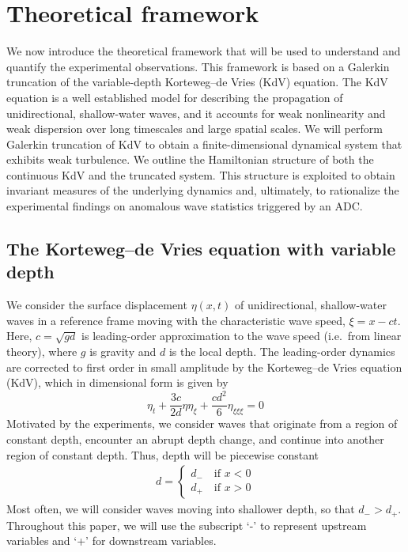 \documentclass[11pt]{article}
\newcommand{\depth}{d}
\newcommand{\dup}{\depth_{-}}
\newcommand{\ddn}{\depth_{+}}
\begin{document}
\section{Theoretical framework}
\label{theory}

We now introduce the theoretical framework that will be used to understand and quantify the experimental observations. This framework is based on a Galerkin truncation of the variable-depth Korteweg–de Vries (KdV) equation. The KdV equation is a well established model for describing the propagation of unidirectional, shallow-water waves, and it accounts for weak nonlinearity and weak dispersion over long timescales and large spatial scales. We will perform Galerkin truncation of KdV to obtain a finite-dimensional dynamical system that exhibits weak turbulence. We outline the Hamiltonian structure of both the continuous KdV and the truncated system. This structure is exploited to obtain invariant measures of the underlying dynamics and, ultimately, to rationalize the experimental findings on anomalous wave statistics triggered by an ADC.


\subsection{The Korteweg–de Vries equation with variable depth}

We consider the surface displacement $\eta(x,t)$ of unidirectional, shallow-water waves in a reference frame moving with the characteristic wave speed, $\xi = x - ct$. Here, $c = \sqrt{g \depth}$ is leading-order approximation to the wave speed (i.e.~from linear theory), where $g$ is gravity and $\depth$ is the local depth.
The leading-order dynamics are corrected to first order in small amplitude by the Korteweg–de Vries equation (KdV), which in dimensional form is given by \cite{whitham2011linear}
\begin{equation}
\label{KdV}
\eta_t + \frac{3 c}{2 \depth} \eta \eta_{\xi} + \frac{c \depth^2}{6} \eta_{\xi \xi \xi} = 0
\end{equation}
Motivated by the experiments, we consider waves that originate from a region of constant depth, encounter an abrupt depth change, and continue into another region of constant depth. Thus, depth will be piecewise constant
\begin{align}
\depth = 
\begin{cases}
\dup \quad \mbox{if } x<0 \\
\ddn \quad \mbox{if } x>0
\end{cases}
\end{align}
Most often, we will consider waves moving into shallower depth, so that $\dup > \ddn$. Throughout this paper, we will use the subscript `-' to represent upstream variables and `+' for downstream variables.
\end{document}
